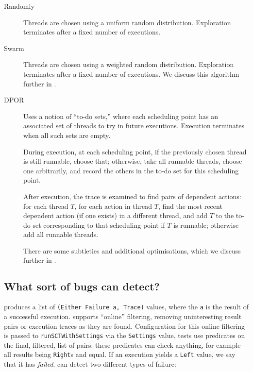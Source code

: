 \begin{description}
\item[Randomly] Threads are chosen using a uniform random
  distribution.  Exploration terminates after a fixed number of
  executions.

\item[Swarm] Threads are chosen using a weighted random distribution.
  Exploration terminates after a fixed number of executions.  We
  discuss this algorithm further in .

\item[DPOR] Uses a notion of ``to-do sets,'' where each scheduling
  point has an associated set of threads to try in future executions.
  Execution terminates when all such sets are empty.

  During execution, at each scheduling point, if the previously chosen
  thread is still runnable, choose that; otherwise, take all runnable
  threads, choose one arbitrarily, and record the others in the to-do
  set for this scheduling point.

  After execution, the trace is examined to find pairs of dependent
  actions: for each thread $T$, for each action in thread $T$, find
  the most recent dependent action (if one exists) in a different
  thread, and add $T$ to the to-do set corresponding to that
  scheduling point if $T$ is runnable; otherwise add all runnable
  threads.

  There are some subtleties and additional optimisations, which we
  discuss further in .
\end{description}

\subsection{What sort of bugs can \dejafu{} detect?}
\label{sec:dejafu-whatis-bugs}

\dejafu{} produces a list of \verb|(Either Failure a, Trace)| values,
where the \verb|a| is the result of a successful execution.  \dejafu{}
supports ``online'' filtering, removing uninteresting result pairs or
execution traces as they are found.  Configuration for this online
filtering is passed to \verb|runSCTWithSettings| via the
\verb|Settings| value.  \dejafu{} tests use predicates on the final,
filtered, list of pairs: these predicates can check anything, for
example all results being \verb|Right|s and equal.  If an execution
yields a \verb|Left| value, we say that it has \emph{failed}.
\dejafu{} can detect two different types of failure:

